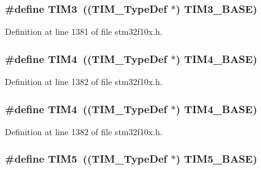 \subsubsection[{\texorpdfstring{T\+I\+M3}{TIM3}}]{\setlength{\rightskip}{0pt plus 5cm}\#define T\+I\+M3~(({\bf T\+I\+M\+\_\+\+Type\+Def} $\ast$) {\bf T\+I\+M3\+\_\+\+B\+A\+SE})}\hypertarget{group___peripheral__declaration_ga61ee4c391385607d7af432b63905fcc9}{}\label{group___peripheral__declaration_ga61ee4c391385607d7af432b63905fcc9}


Definition at line 1381 of file stm32f10x.\+h.

\subsubsection[{\texorpdfstring{T\+I\+M4}{TIM4}}]{\setlength{\rightskip}{0pt plus 5cm}\#define T\+I\+M4~(({\bf T\+I\+M\+\_\+\+Type\+Def} $\ast$) {\bf T\+I\+M4\+\_\+\+B\+A\+SE})}\hypertarget{group___peripheral__declaration_ga91a09bad8bdc7a1cb3d85cf49c94c8ec}{}\label{group___peripheral__declaration_ga91a09bad8bdc7a1cb3d85cf49c94c8ec}


Definition at line 1382 of file stm32f10x.\+h.

\subsubsection[{\texorpdfstring{T\+I\+M4}{TIM4}}]{\setlength{\rightskip}{0pt plus 5cm}\#define T\+I\+M4~(({\bf T\+I\+M\+\_\+\+Type\+Def} $\ast$) {\bf T\+I\+M4\+\_\+\+B\+A\+SE})}\hypertarget{group___peripheral__declaration_ga91a09bad8bdc7a1cb3d85cf49c94c8ec}{}\label{group___peripheral__declaration_ga91a09bad8bdc7a1cb3d85cf49c94c8ec}


Definition at line 1382 of file stm32f10x.\+h.

\subsubsection[{\texorpdfstring{T\+I\+M5}{TIM5}}]{\setlength{\rightskip}{0pt plus 5cm}\#define T\+I\+M5~(({\bf T\+I\+M\+\_\+\+Type\+Def} $\ast$) {\bf T\+I\+M5\+\_\+\+B\+A\+SE})}\hypertarget{group___peripheral__declaration_ga5125ff6a23a2ed66e2e19bd196128c14}{}\label{group___peripheral__declaration_ga5125ff6a23a2ed66e2e19bd196128c14}


